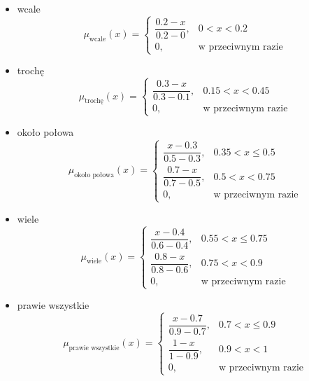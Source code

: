 \documentclass{article}
\begin{document}
\begin{itemize}
    \item wcale
        \begin{equation}
            \mu_{\text{wcale}}(x) =
        \begin{cases}
        \dfrac{0.2 - x}{0.2 - 0}, & 0 < x < 0.2 \\
        0, & \text{w przeciwnym razie}
        \end{cases}
        \end{equation}
    \item trochę
        \begin{equation}
            \mu_{\text{trochę}}(x) =
\begin{cases}
\dfrac{0.3 - x}{0.3 - 0.1}, & 0.15 < x < 0.45 \\
0, & \text{w przeciwnym razie}
\end{cases}
        \end{equation}
    \item około połowa
        \begin{equation}
\mu_{\text{około połowa}}(x) =
\begin{cases}
\dfrac{x - 0.3}{0.5 - 0.3}, & 0.35 < x \leq 0.5 \\
\dfrac{0.7 - x}{0.7 - 0.5}, & 0.5 < x < 0.75 \\
0, & \text{w przeciwnym razie}
\end{cases}
        \end{equation}
    \item{wiele}
        \begin{equation}
            \mu_{\text{wiele}}(x) =
\begin{cases}
\dfrac{x - 0.4}{0.6 - 0.4}, & 0.55 < x \leq 0.75 \\
\dfrac{0.8 - x}{0.8 - 0.6}, & 0.75 < x < 0.9 \\
0, & \text{w przeciwnym razie}
\end{cases}
        \end{equation}
    \item{prawie wszystkie}
        \begin{equation}
            \mu_{\text{prawie wszystkie}}(x) =
\begin{cases}
\dfrac{x - 0.7}{0.9 - 0.7}, & 0.7 < x \leq 0.9 \\
\dfrac{1 - x}{1 - 0.9}, & 0.9 < x < 1 \\
0, & \text{w przeciwnym razie}
\end{cases}
        \end{equation}
\end{itemize}
\end{document}
